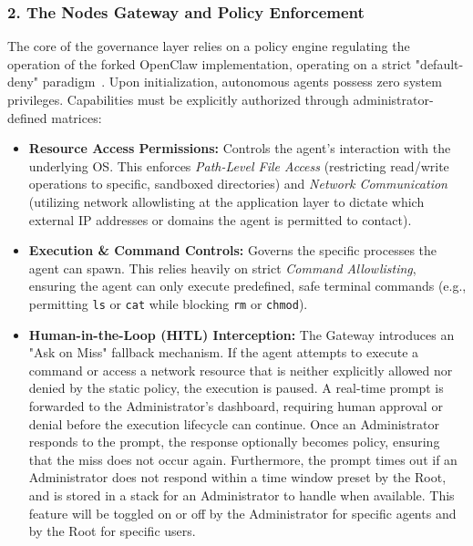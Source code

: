 \documentclass[a4paper]{report}
\begin{document}
\subsubsection*{2. The Nodes Gateway and Policy Enforcement}
The core of the governance layer relies on a policy engine regulating the operation of the forked OpenClaw implementation, operating on a strict "default-deny" paradigm~\cite{foerster2026camels}. Upon initialization, autonomous agents possess zero system privileges. Capabilities must be explicitly authorized through administrator-defined matrices:
\begin{itemize}
    \item \textbf{Resource Access Permissions:} Controls the agent's interaction with the underlying OS. This enforces \textit{Path-Level File Access} (restricting read/write operations to specific, sandboxed directories) and \textit{Network Communication} (utilizing network allowlisting at the application layer to dictate which external IP addresses or domains the agent is permitted to contact).
    \item \textbf{Execution \& Command Controls:} Governs the specific processes the agent can spawn. This relies heavily on strict \textit{Command Allowlisting}, ensuring the agent can only execute predefined, safe terminal commands (e.g., permitting \texttt{ls} or \texttt{cat} while blocking \texttt{rm} or \texttt{chmod}).
    \item \textbf{Human-in-the-Loop (HITL) Interception:} The Gateway introduces an "Ask on Miss" fallback mechanism. If the agent attempts to execute a command or access a network resource that is neither explicitly allowed nor denied by the static policy, the execution is paused. A real-time prompt is forwarded to the Administrator's dashboard, requiring human approval or denial before the execution lifecycle can continue. Once an Administrator responds to the prompt, the response optionally becomes policy, ensuring that the miss does not occur again. Furthermore, the prompt times out if an Administrator does not respond within a time window preset by the Root, and is stored in a stack for an Administrator to handle when available. This feature will be toggled on or off by the Administrator for specific agents and by the Root for specific users.
\end{itemize}
\end{document}

